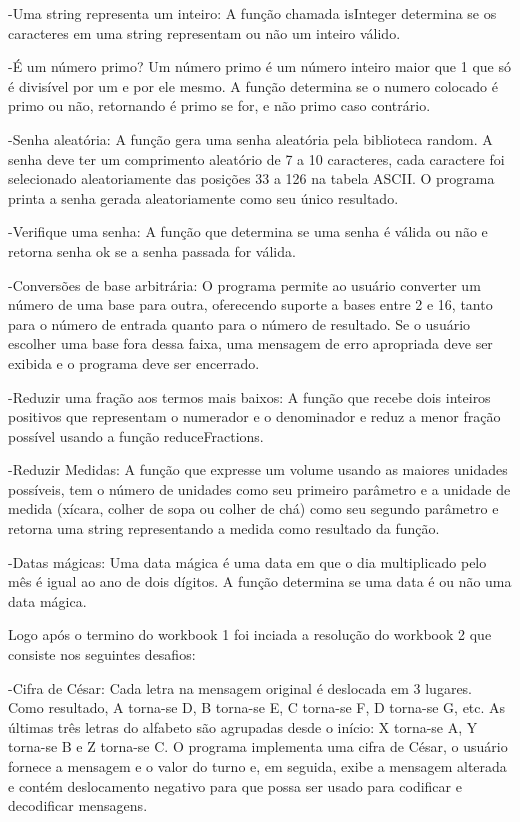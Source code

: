 -Uma string representa um inteiro: A função chamada isInteger determina se os caracteres em uma string representam ou não um inteiro válido.

-É um número primo? Um número primo é um número inteiro maior que 1 que só é divisível por um e por ele mesmo. A função determina se o numero colocado é primo ou não, retornando é primo se for, e não primo caso contrário. 

-Senha aleatória: A função gera uma senha aleatória pela biblioteca random. A senha deve ter um comprimento aleatório de 7 a 10 caracteres, cada caractere foi selecionado aleatoriamente das posições 33 a 126 na tabela ASCII. O programa printa a senha gerada aleatoriamente como seu único resultado.

-Verifique uma senha: A função que determina se uma senha é válida ou não e retorna senha ok se a senha passada for válida.

-Conversões de base arbitrária: O programa permite ao usuário converter um número de uma base para outra, oferecendo suporte a bases entre 2 e 16, tanto para o número de entrada quanto para o número de resultado. Se o usuário escolher uma base fora dessa faixa, uma mensagem de erro apropriada deve ser exibida e o programa deve ser encerrado.

-Reduzir uma fração aos termos mais baixos: A função que recebe dois inteiros positivos que representam o numerador e o denominador e reduz a menor fração possível usando a função reduceFractions. 

-Reduzir Medidas: A função que expresse um volume usando as maiores unidades possíveis, tem o número de unidades como seu primeiro parâmetro e a unidade de medida (xícara, colher de sopa ou colher de chá) como seu segundo parâmetro e retorna uma string representando a medida como resultado da função. 

-Datas mágicas: Uma data mágica é uma data em que o dia multiplicado pelo mês é igual ao ano de dois dígitos. A função determina se uma data é ou não uma data mágica. 

Logo após o termino do workbook 1 foi inciada a resolução do workbook 2 que consiste nos seguintes desafios:

-Cifra de César: Cada letra na mensagem original é deslocada em 3 lugares. Como resultado, A torna-se D, B torna-se E, C torna-se F, D torna-se G, etc. As últimas três letras do alfabeto são agrupadas desde o início: X torna-se A, Y torna-se B e Z torna-se C. 
O  programa implementa uma cifra de César, o usuário fornece a mensagem e o valor do turno e, em seguida, exibe a mensagem alterada e contém deslocamento negativo para que possa ser usado para codificar e decodificar mensagens.

